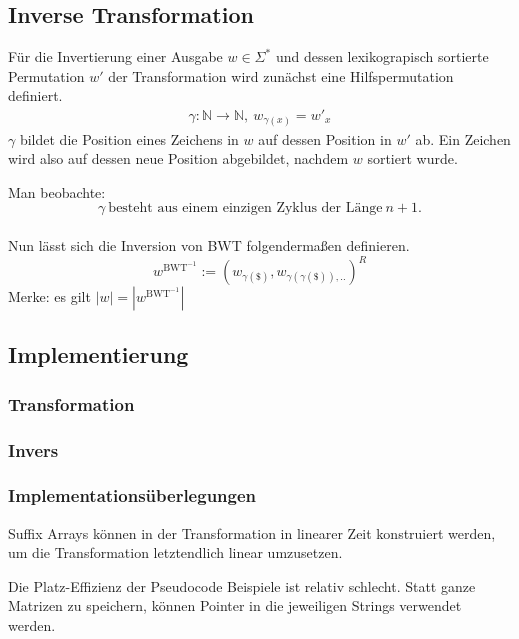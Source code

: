 \documentclass{article}
\begin{document}
\subsection{Inverse Transformation}
Für die Invertierung einer Ausgabe $w\in\Sigma^*$ und dessen lexikograpisch sortierte Permutation $w'$ der Transformation wird zunächst eine Hilfspermutation definiert.
\begin{equation}
\begin{split}
    \gamma:\mathbb{N}\rightarrow\mathbb{N},~w_{\gamma(x)}=w'_x
\end{split}
\end{equation}
$\gamma$ bildet die Position eines Zeichens in $w$ auf dessen Position in $w'$ ab. Ein Zeichen wird also auf dessen neue Position abgebildet, nachdem $w$ sortiert wurde.

Man beobachte: 
\begin{equation}
    \gamma~\text{besteht aus einem einzigen Zyklus der Länge}~n+1.
\end{equation}
\\[.5cm]
Nun lässt sich die Inversion von BWT folgendermaßen definieren.
\begin{equation}
    w^{\text{BWT}^{-1}}:=(w_{\gamma(\$)},w_{\gamma(\gamma(\$)),..})^R
\end{equation}
Merke: es gilt $|w|=|w^{\text{BWT}^{-1}}|$
\subsection{Implementierung}
\subsubsection{Transformation}

\subsubsection{Invers}

\subsubsection{Implementationsüberlegungen}
Suffix Arrays können in der Transformation in linearer Zeit konstruiert werden, um die Transformation letztendlich linear umzusetzen.

Die Platz-Effizienz der Pseudocode Beispiele ist relativ schlecht. Statt ganze Matrizen zu speichern, können Pointer in die jeweiligen Strings verwendet werden.
\newpage
\printbibliography[heading=bibintoc]
\end{document}
